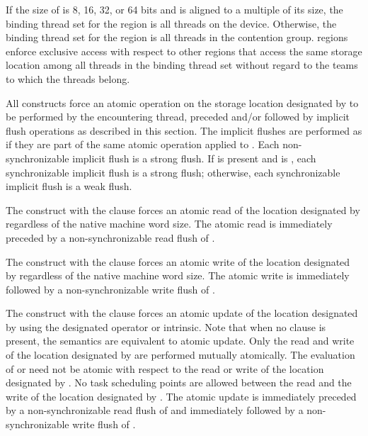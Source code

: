 \begin{samepage}

\binding
If the size of  is 8, 16, 32, or 64 bits and  is aligned to a
multiple of its size, the binding thread set for the  region is 
all threads on the device. Otherwise, the binding thread set for the 
 region is all threads in the contention group.   
regions enforce exclusive access with respect to other  regions 
that access the same storage location  among all threads in the 
binding thread set without regard to the teams to which the threads belong. 

\descr

All  constructs force an atomic operation on the storage location
designated by  to be performed by the encountering thread, preceded
and/or followed by implicit flush operations as described in this section. The
implicit flushes are performed as if they are part of the same atomic
operation applied to .  Each non-synchronizable implicit flush is a
strong flush. If  is present and is ,
each synchronizable implicit flush is a strong flush; otherwise,
each synchronizable implicit flush is a weak flush.

The  construct with the  clause forces an atomic read of the location 
designated by  regardless of the native machine word size. The atomic
read is immediately preceded by a non-synchronizable read flush of .
\end{samepage}

The  construct with the  clause forces an atomic write of the location 
designated by  regardless of the native machine word size. The atomic
write is immediately followed by a non-synchronizable write flush of .

The  construct with the  clause forces an atomic update of the location 
designated by  using the designated operator or intrinsic. Note that when no clause is 
present, the semantics are equivalent to atomic update. Only the read and write of the 
location designated by  are performed mutually atomically. The evaluation of  or 
 need not be atomic with respect to the read or write of the location designated 
by . No task scheduling points are allowed between the read and the write of the 
location designated by . The atomic update is immediately preceded by
a non-synchronizable read flush of  and immediately followed by a
non-synchronizable write flush of .

